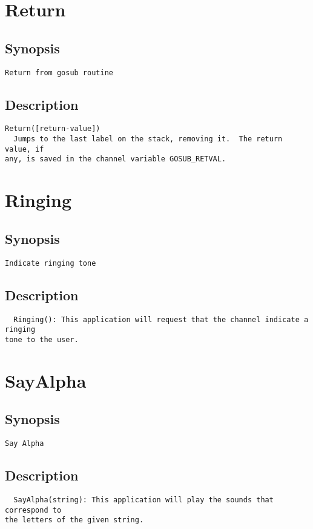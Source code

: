 \section{Return}
\subsection{Synopsis}
\begin{verbatim}
Return from gosub routine
\end{verbatim}
\subsection{Description}
\begin{verbatim}
Return([return-value])
  Jumps to the last label on the stack, removing it.  The return value, if
any, is saved in the channel variable GOSUB_RETVAL.

\end{verbatim}


\section{Ringing}
\subsection{Synopsis}
\begin{verbatim}
Indicate ringing tone
\end{verbatim}
\subsection{Description}
\begin{verbatim}
  Ringing(): This application will request that the channel indicate a ringing
tone to the user.

\end{verbatim}


\section{SayAlpha}
\subsection{Synopsis}
\begin{verbatim}
Say Alpha
\end{verbatim}
\subsection{Description}
\begin{verbatim}
  SayAlpha(string): This application will play the sounds that correspond to
the letters of the given string.

\end{verbatim}


